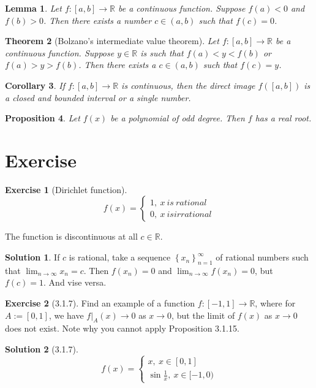 \documentclass{article}
\newtheorem{theorem}{Theorem}[section]
\newtheorem{lemma}[theorem]{Lemma}
\newtheorem{corollary}[theorem]{Corollary}
\newtheorem{prop}[theorem]{Proposition}
\theoremstyle{definition}
\newtheorem{exe}{Exercise}[section]
\newtheorem{sol}{Solution}[exe]
\begin{document}
\begin{lemma}
    Let \( f: [a, b] \rightarrow \mathbb{R} \) be a continuous function. Suppose \( f(a) < 0 \) and \( f(b) > 0 \). Then there exists a number \( c \in (a, b) \) such that \( f(c) = 0 \).
\end{lemma}


\begin{theorem}[Bolzano's intermediate value theorem] 
    Let \( f: [a, b] \rightarrow \mathbb{R} \) be a continuous function. Suppose \( y \in \mathbb{R} \) is such that \( f(a) < y < f(b) \) or \( f(a) > y > f(b) \). Then there exists a \( c \in (a, b) \) such that \( f(c) = y \).   
\end{theorem}

\begin{corollary}
    If $f:[a,b]\to\mathbb{R}$ is continuous, then the direct image $f([a,b])$ is a closed and bounded interval or a single number.
\end{corollary}


\begin{prop}
    Let $f(x)$ be a polynomial of odd degree. Then $f$ has a real root.
\end{prop}



\newpage

\section{Exercise}

\begin{exe}[Dirichlet function]

    $$f(x)=\begin{cases}
        1,\ x\ is\ rational\\
        0,\ x\ is irrational
    \end{cases}$$

    The function is discontinuous at all $c\in\mathbb{R}$.
\end{exe}

\begin{sol}
If $c$ is rational, take a sequence $\left\{x_n\right\}_{n=1}^{\infty}$ of rational numbers such that $\lim_{n\to\infty}x_n=c$. Then 
$f(x_{n})=0$ and $\lim_{n\to \infty}f(x_n)=0$, but $f(c)=1$. And vise versa.
\end{sol}





\begin{exe}[3.1.7]
    Find an example of a function \( f: [-1,1] \rightarrow \mathbb{R} \), where for \( A := [0,1] \), we have \( f|_{A}(x) \rightarrow 0 \) as \( x \rightarrow 0 \), but the limit of \( f(x) \) as \( x \rightarrow 0 \) does not exist. Note why you cannot apply Proposition 3.1.15.
\end{exe}
\begin{sol}[3.1.7]
$$f(x)=\begin{cases}
    x,\ x\in [0,1]\\
    \sin\frac{1}{x},\ x\in [-1,0)
\end{cases}$$
\end{sol}
\end{document}
